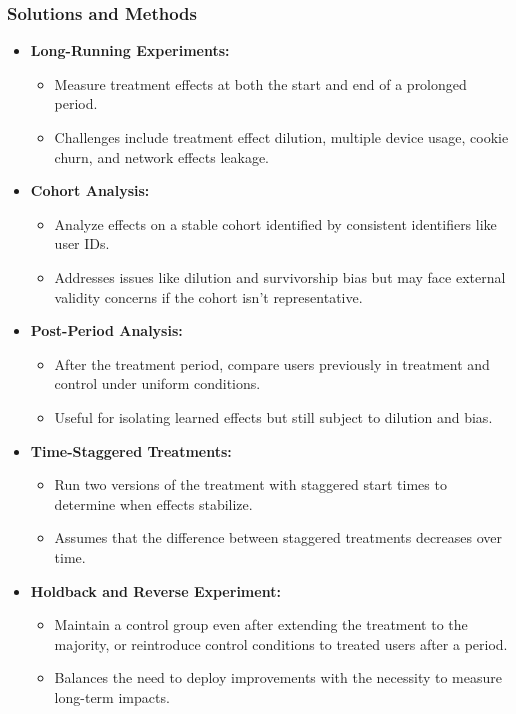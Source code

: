 \documentclass{article}
\begin{document}
\subsubsection*{Solutions and Methods}
\begin{itemize}
    \item \textbf{Long-Running Experiments:}
    \begin{itemize}
        \item Measure treatment effects at both the start and end of a prolonged period.
        \item Challenges include treatment effect dilution, multiple device usage, cookie churn, and network effects leakage.
    \end{itemize}

    \item \textbf{Cohort Analysis:}
    \begin{itemize}
        \item Analyze effects on a stable cohort identified by consistent identifiers like user IDs.
        \item Addresses issues like dilution and survivorship bias but may face external validity concerns if the cohort isn't representative.
    \end{itemize}

    \item \textbf{Post-Period Analysis:}
    \begin{itemize}
        \item After the treatment period, compare users previously in treatment and control under uniform conditions.
        \item Useful for isolating learned effects but still subject to dilution and bias.
    \end{itemize}

    \item \textbf{Time-Staggered Treatments:}
    \begin{itemize}
        \item Run two versions of the treatment with staggered start times to determine when effects stabilize.
        \item Assumes that the difference between staggered treatments decreases over time.
    \end{itemize}

    \item \textbf{Holdback and Reverse Experiment:}
    \begin{itemize}
        \item Maintain a control group even after extending the treatment to the majority, or reintroduce control conditions to treated users after a period.
        \item Balances the need to deploy improvements with the necessity to measure long-term impacts.
    \end{itemize}
\end{itemize}
\end{document}
